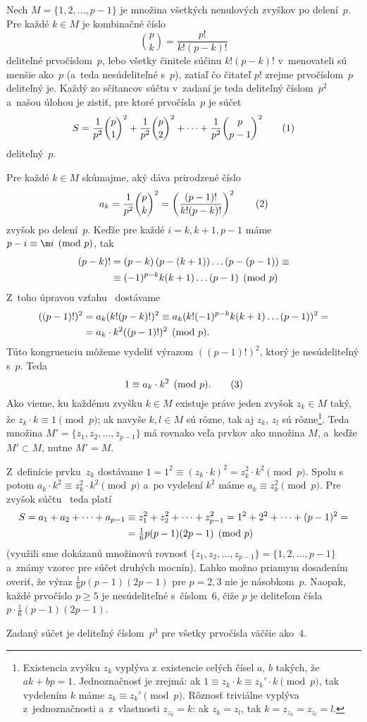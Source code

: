 {%
Nech $M=\{1,2,\dots,p-1\}$ je množina všetkých nenulových zvyškov po delení~$p$. Pre každé $k\in M$ je kombinačné číslo
$$
\binom pk=\frac{p!}{k!(p-k)!}
$$
deliteľné prvočíslom~$p$, lebo všetky činitele súčinu $k!(p-k)!$ v~menovateli sú menšie ako~$p$ (a~teda nesúdeliteľné s~$p$), zatiaľ čo čitateľ $p!$ zrejme prvočíslom~$p$ deliteľný je. Každý zo sčítancov súčtu v~zadaní je teda deliteľný číslom~$p^2$ a~našou úlohou je zistiť, pre ktoré prvočísla~$p$ je súčet
$$
S=\frac1{p^2}\binom p1^2+\frac1{p^2}\binom p2^2+\cdots+\frac1{p^2}\binom p{p-1}^2
\tag1
$$
deliteľný~$p$.

Pre každé $k\in M$ skúmajme, aký dáva prirodzené číslo
$$
a_k=\frac1{p^2}\binom pk^2=\left(\frac{(p-1)!}{k!(p-k)!}\right)^2
\tag2
$$
zvyšok po delení~$p$. Keďže pre každé $i=k,k+1,p-1$ máme $p-i\equiv\m i\pmod p$, tak
$$
\aligned
(p-k)!&=(p-k)\left(p-(k+1)\right)\dots\left(p-(p-1)\right)\equiv\\
      &\equiv(-1)^{p-k}k(k+1)\dots(p-1)\pmod p
\endaligned
$$
Z~toho úpravou vzťahu~ dostávame
$$
\aligned
((p-1)!)^2&=a_k(k!(p-k)!)^2\equiv a_k(k!(-1)^{p-k}k(k+1)\dots(p-1))^2=\\
          &=a_k\cdot k^2((p-1)!)^2\pmod p.
\endaligned
$$
Túto kongruenciu môžeme vydeliť výrazom $((p-1)!)^2$, ktorý je nesúdeliteľný s~$p$. Teda
$$
1\equiv a_k\cdot k^2\pmod p.
\tag3
$$
Ako vieme, ku každému zvyšku $k\in M$ existuje práve jeden zvyšok $z_k\in M$ taký, že $z_k\cdot k\equiv1\pmod p$; ak navyše $k,l\in M$ sú rôzne, tak aj $z_k$, $z_l$ sú rôzne\footnote{Existencia zvyšku $z_k$ vyplýva z~existencie celých čísel $a$, $b$ takých, že $ak+bp=1$. Jednoznačnosť je zrejmá: ak $1\equiv z_k\cdot k\equiv z_k'\cdot k\pmod p$, tak vydelením $k$ máme $z_k\equiv z_k'\pmod p$. Rôznosť triviálne vyplýva z~jednoznačnosti a~z~vlastnosti $z_{z_k}=k$: ak $z_k=z_l$, tak $k=z_{z_k}=z_{z_l}=l$.}. Teda množina $M'=\{z_1,z_2,\dots,z_{p-1}\}$ má rovnako veľa prvkov ako množina $M$, a~keďže $M'\subset M$, nutne $M'=M$.

Z~definície prvku~$z_k$ dostávame $1=1^2\equiv(z_k\cdot k)^2=z_k^2\cdot k^2\pmod p$. Spolu s~ potom $a_k\cdot k^2\equiv z_k^2\cdot k^2\pmod p$ a~po vydelení $k^2$ máme $a_k\equiv z_k^2\pmod p$. Pre zvyšok súčtu~ teda platí
$$
\aligned
S=a_1+a_2+\cdots+a_{p-1}&\equiv z_1^2+z_2^2+\cdots+z_{p-1}^2=1^2+2^2+\cdots+(p-1)^2=\\
                        &=\tfrac16p(p-1)(2p-1)\pmod p
\endaligned
$$
(využili sme dokázanú množinovú rovnosť $\{z_1,z_2,\dots,z_{p-1}\}=\{1,2,\dots,p-1\}$ a~známy vzorec pre súčet druhých mocnín). Ľahko možno priamym dosadením overiť, že výraz $\frac16p(p-1)(2p-1)$ pre $p=2,3$ nie je násobkom~$p$. Naopak, každé prvočíslo $p\ge5$ je nesúdeliteľné s~číslom~$6$, čiže $p$ je deliteľom čísla $p\cdot\frac16(p-1)(2p-1)$.

\odpoved
Zadaný súčet je deliteľný číslom~$p^3$ pre všetky prvočísla väčšie ako~$4$.
}

